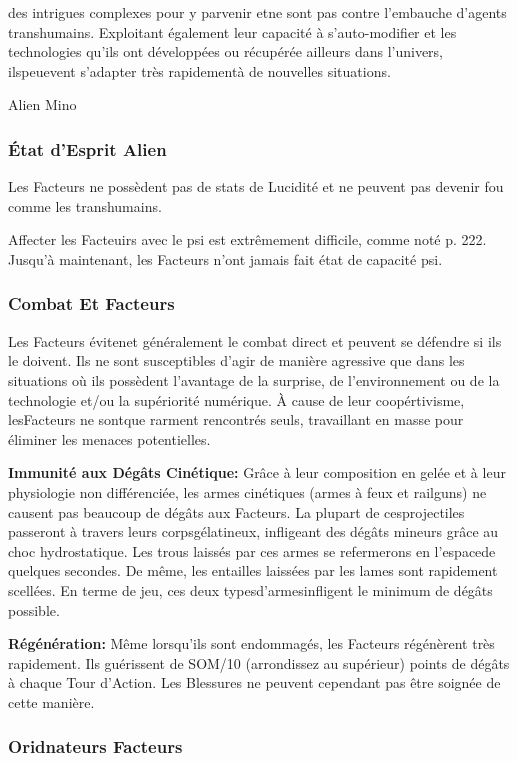 des intrigues complexes pour y parvenir etne sont pas contre l'embauche d'agents transhumains. Exploitant également leur capacité à s'auto-modifier et les technologies qu'ils ont développées ou récupérée ailleurs dans l'univers, ilspeuevent s'adapter très rapidementà de nouvelles situations.

{Alien Mino 

\subsubsection{État d'Esprit Alien} 

Les Facteurs ne possèdent pas de stats de Lucidité et ne peuvent pas devenir fou comme les transhumains. 

Affecter les Facteuirs avec le psi est extrêmement difficile, comme noté p. 222. Jusqu'à maintenant, les Facteurs n'ont jamais fait état de capacité psi. 

\subsubsection{Combat Et Facteurs} 

Les Facteurs évitenet généralement le combat direct et peuvent se défendre si ils le doivent. Ils ne sont susceptibles d'agir de manière agressive que dans les situations où ils possèdent l'avantage de la surprise, de l'environnement ou de la technologie et/ou la supériorité numérique. À cause de leur coopértivisme, lesFacteurs ne sontque rarment rencontrés seuls, travaillant en masse pour éliminer les menaces potentielles. 

\textbf{Immunité aux Dégâts Cinétique: }Grâce à leur composition en gelée et à leur physiologie non différenciée, les armes cinétiques (armes à feux et railguns) ne causent pas beaucoup de dégâts aux Facteurs. La plupart de cesprojectiles passeront à travers leurs corpsgélatineux, infligeant des dégâts mineurs grâce au choc hydrostatique. Les trous laissés par ces armes se refermerons en l'espacede quelques secondes. De même, les entailles laissées par les lames sont rapidement scellées. En terme de jeu, ces deux typesd'armesinfligent le minimum de dégâts possible. 

\textbf{Régénération: }Même lorsqu'ils sont endommagés, les Facteurs régénèrent très rapidement. Ils guérissent de SOM/10 (arrondissez au supérieur) points de dégâts à chaque Tour d'Action. Les Blessures ne peuvent cependant pas être soignée de cette manière. 

\subsubsection{Oridnateurs Facteurs} 

}
